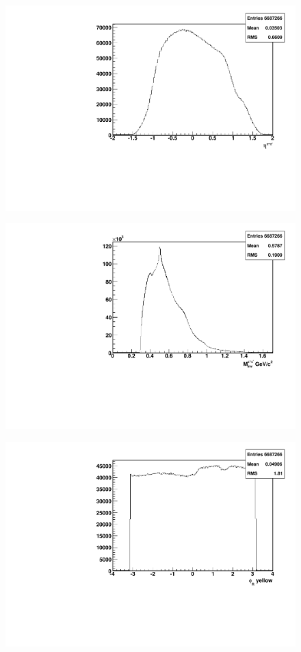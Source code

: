 \documentclass[abstract = on,listof=totoc, bibliography=totoc]{scrreprt}
\newcommand{\phir}{\phi_{R}}
\newcommand{\pip}{\pi^+}
\newcommand{\pim}{\pi^-}
\newcommand{\pair}{$\pip\pim$ }
\begin{document}
\begin{figure}
\begin{center}
\includegraphics[width = .8\textwidth]{hEtaPair}
\caption[$\eta$ distribution of \pair pair]{}
\label{fig:}
\end{center}
\end{figure}


\begin{figure}
\begin{center}
\includegraphics[width = .8\textwidth]{hInvarM}
\caption[Invariant mass distribution of \pair pair]{}
\label{fig:}
\end{center}
\end{figure}

\begin{figure}
\begin{center}
\includegraphics[width = .8\textwidth]{hPhiRy}
\caption[$\phir$ distribution of \pair pair with reference to the yellow beam polarization]{}
\label{fig:}
\end{center}
\end{figure}
\end{document}
